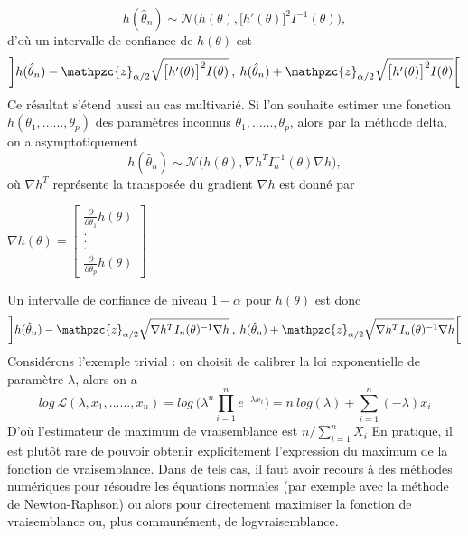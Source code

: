 \documentclass[french]{report}
\begin{document}
\begin{equation*}
    h(\hat{\theta}_n) \sim \mathcal{N} \big (h(\theta), \big[h'(\theta) \big]^2 I^{-1}(\theta) \big),
\end{equation*}
d'où un intervalle de confiance de $h(\theta)$ est
\begin{equation*}
   \bigg ]h(\hat{\theta}_n) - \mathpzc{z}_{\alpha/2}\sqrt{\big[h'(\theta) \big]^2 I(\theta)} \:,\: h(\hat{\theta}_n) + \mathpzc{z}_{\alpha/2}\sqrt{\big[h'(\theta) \big]^2 I(\theta)}\bigg[ 
\end{equation*}
Ce résultat s'étend aussi au cas multivarié. Si l'on souhaite estimer une fonction $h(\theta_1,......, \theta_p)$ des paramètres inconnus $\theta_1,......, \theta_p$, alors par la méthode delta, on a asymptotiquement
\begin{equation*}
    h(\hat{\theta}_n) \sim \mathcal{N} \big (h(\theta), \nabla h^T  I_n^{-1}(\theta) \nabla h \big),
\end{equation*}
où $\nabla h^T$ représente la transposée du gradient $\nabla h$ est donné par 
\begin{center}
$ \nabla h(\theta) = 
    \begin{bmatrix}
    \frac{\partial}{\partial \theta_1} h(\theta)\\
    . \\
    . \\
    . \\
    \frac{\partial}{\partial \theta_p} h(\theta)
    \end{bmatrix}
$
\end{center}
Un intervalle de confiance de niveau $1 - \alpha$ pour $h(\theta)$ est donc
\begin{equation*}
   \bigg ]h(\hat{\theta}_n) - \mathpzc{z}_{\alpha/2}\sqrt{\nabla h^T  I_n(\theta)^{-1} \nabla h} \:,\: h(\hat{\theta}_n) + \mathpzc{z}_{\alpha/2}\sqrt{\nabla h^T  I_n(\theta)^{-1} \nabla h}\bigg[ 
\end{equation*}
Considérons l'exemple trivial : on choisit de calibrer la loi exponentielle de paramètre $\lambda$, alors on a
\begin{equation*}
    log \:\mathcal{L}(\lambda,x_1,......,x_n) = log \: \bigg ( \lambda^n \prod_{i=1}^{n} e^{- \lambda x_i} \bigg ) = n \: log(\lambda) + \sum_{i=1}^{n} (-\lambda)x_i
\end{equation*}
D'où l'estimateur de maximum de vraisemblance est $ n/\sum_{i=1}^{n}X_i $
\vskip 0.1in
En pratique, il est plutôt rare de pouvoir obtenir explicitement l'expression du maximum de la fonction de vraisemblance. Dans de tels cas, il faut avoir recours à des méthodes numériques pour résoudre les équations normales (par exemple avec la méthode de Newton-Raphson) ou alors pour directement maximiser la fonction de vraisemblance ou, plus communément, de logvraisemblance.
\end{document}

